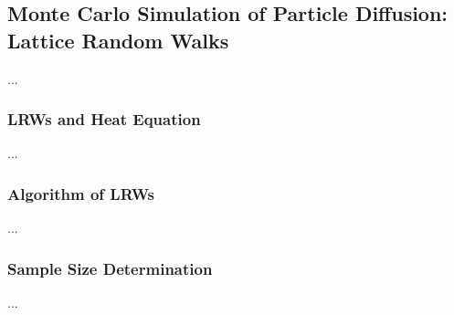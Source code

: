 \subsection{Monte Carlo Simulation of Particle Diffusion: Lattice Random Walks}


...


\subsubsection{LRWs and Heat Equation}


...


\subsubsection{Algorithm of LRWs}


...


\subsubsection{Sample Size Determination}


...




